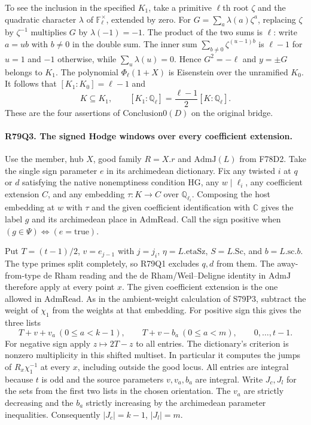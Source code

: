 To see the inclusion in the specified $K_1$, take a primitive
$\ell$th root $\zeta$ and the quadratic character $\lambda$ of
$\mathbb F_\ell^\times$, extended by zero. For
$G=\sum_a\lambda(a)\zeta^a$, replacing $\zeta$ by $\zeta^{-1}$
multiplies $G$ by $\lambda(-1)=-1$. The product of the two sums
is $\ell$: write $a=ub$ with $b\ne0$ in the double sum. The
inner sum $\sum_{b\ne0}\zeta^{(u-1)b}$ is $\ell-1$ for $u=1$
and $-1$ otherwise, while $\sum_u\lambda(u)=0$. Hence
$G^2=-\ell$ and $y=\pm G$ belongs to $K_1$. The polynomial
$\Phi_\ell(1+X)$ is Eisenstein over the unramified $K_0$.
It follows that $[K_1:K_0]=\ell-1$ and
\[
 K\subseteq K_1,\qquad
 [K_1:\mathbb Q_\ell]=\frac{\ell-1}{2}[K:\mathbb Q_\ell].
\]
These are the four assertions of $\mathrm{Conclusion0}(D)$ on
the original bridge.

\paragraph{R79Q3. The signed Hodge windows over every coefficient extension.}
Use the member, hub $X$, good family $R=X.r$ and
$\mathrm{AdmJ}(L)$ from F78D2. Take the single sign parameter
$e$ in its archimedean dictionary. Fix any twisted $i$ at $q$ or $d$
satisfying the native nonemptiness condition $\mathrm{HG}$, any
$w\mid\ell_i$, any coefficient extension $C$, and any embedding
$\tau:K\to C$ over $\mathbb Q_{\ell_i}$. Composing the host
embedding at $w$ with $\tau$ and the given coefficient identification
with $\mathbb C$ gives the label $g$ and its archimedean place in
$\mathrm{AdmRead}$. Call the sign positive when
$(g\in\Psi)\Leftrightarrow(e=\mathrm{true})$.

Put $T=(t-1)/2$, $v=e_{j-1}$ with $j=j_i$, $\eta=L.\mathrm{etaSz}$,
$S=L.\mathrm{Sc}$, and $b=L.\mathrm{sc}.b$. The type primes
split completely, so R79Q1 excludes $q,d$ from them. The
away-from-type de Rham reading and the de Rham/Weil--Deligne
identity in $\mathrm{AdmJ}$ therefore apply at every point $x$.
The given coefficient extension is the one allowed in
$\mathrm{AdmRead}$. As in the ambient-weight calculation of
S79P3, subtract the weight of $\chi_1$ from the weights at that
embedding. For positive sign this gives the three lists
\[
 T+v+v_a\ (0\le a<k-1),\qquad
 T+v-b_a\ (0\le a<m),\qquad 0,\ldots,t-1.
\]
For negative sign apply $z\mapsto2T-z$ to all entries.
The dictionary's criterion is nonzero multiplicity in this
shifted multiset. In particular it computes the jumps of
$R_x\chi_1^{-1}$ at every $x$, including outside the good locus.
All entries are integral because $t$ is odd and the source
parameters $v,v_a,b_a$ are integral. Write $J_c,J_l$ for the
sets from the first two lists in the chosen orientation.
The $v_a$ are strictly decreasing and the $b_a$ strictly
increasing by the archimedean parameter inequalities. Consequently
$|J_c|=k-1$, $|J_l|=m$.

